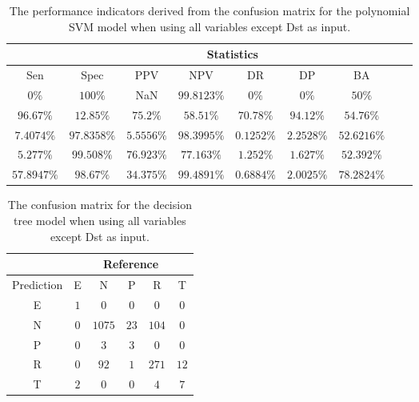 \begin{table}[!ht]
	\centering
	\begin{tabular}{|c|c|c|c|c|c|c|c|c|}
		\hline
		 & \multicolumn{7}{c|}{Statistics} \\ \hline
		Sen & Spec & PPV & NPV & DR & DP & BA \\ \hline
		$0\%$ & $100\%$ & NaN & $99.8123\%$ & $0\%$ & $0\%$ & $50\%$ \\ \hline
		$96.67\%$ & $12.85\%$ & $75.2\%$ & $58.51\%$ & $70.78\%$ & $94.12\%$ & $54.76\%$ \\ \hline
		$7.4074\%$ & $97.8358\%$ & $5.5556\%$ & $98.3995\%$ & $0.1252\%$ & $2.2528\%$ & $52.6216\%$ \\ \hline
		$5.277\%$ & $99.508\%$ & $76.923\%$ & $77.163\%$ & $1.252\%$ & $1.627\%$ & $52.392\%$ \\ \hline
		$57.8947\%$ & $98.67\%$ & $34.375\%$ & $99.4891\%$ & $0.6884\%$ & $2.0025\%$ & $78.2824\%$ \\ \hline
	\end{tabular}
	\caption{The performance indicators derived from the confusion matrix for the polynomial SVM model when using all variables except Dst as input.}
	\label{tab:cs:noDst:svmPoly}
\end{table}

\begin{table}[!ht]
	\centering
	\begin{tabular}{|c|c|c|c|c|c|}
		\hline
		 & \multicolumn{5}{|c|}{Reference} \\ \hline
		 Prediction & E & N & P & R & T \\ \hline
		 E & $1$ & $0$ & $0$ & $0$ & $0$ \\ \hline
		 N & $0$ & $1075$ & $23$ & $104$ & $0$ \\ \hline
		 P & $0$ & $3$ & $3$ & $0$ & $0$ \\ \hline
		 R & $0$ & $92$ & $1$ & $271$ & $12$ \\ \hline
		 T & $2$ & $0$ & $0$ & $4$ & $7$ \\ \hline
	\end{tabular}
	\caption{The confusion matrix for the decision tree model when using all variables except Dst as input.}
	\label{tab:cm:noDst:C5.0}
\end{table}

